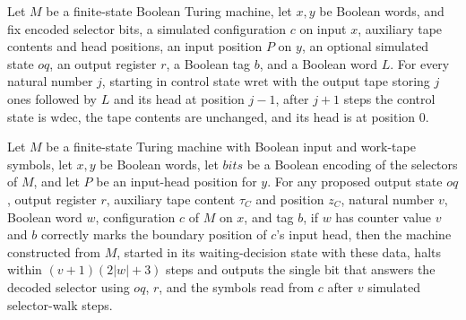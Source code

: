 \begin{theorem}
\label{Complexity.Meyer.wret_sweep}
\leanok
{}
Let $M$ be a finite-state Boolean Turing machine, let $x,y$ be Boolean words, and fix
encoded selector bits, a simulated configuration $c$ on input $x$, auxiliary tape
contents and head positions, an input position $P$ on $y$, an optional simulated state
$oq$, an output register $r$, a Boolean tag $b$, and a Boolean word $L$. For every
natural number $j$, starting in control state $\mathrm{wret}$ with the output tape
storing $j$ ones followed by $L$ and its head at position $j-1$, after $j+1$ steps the
control state is $\mathrm{wdec}$, the tape contents are unchanged, and its head is at
position $0$.
\end{theorem}

\begin{theorem}
\label{Complexity.Meyer.walk_run}
\leanok
{}
Let $M$ be a finite-state Turing machine with Boolean input and work-tape symbols, let
$x,y$ be Boolean words, let $bits$ be a Boolean encoding of the selectors of $M$, and
let $P$ be an input-head position for $y$. For any proposed output state $oq$, output
register $r$, auxiliary tape content $\tau_C$ and position $z_C$, natural number $v$,
Boolean word $w$, configuration $c$ of $M$ on $x$, and tag $b$, if $w$ has counter value
$v$ and $b$ correctly marks the boundary position of $c$'s input head, then the machine
constructed from $M$, started in its waiting-decision state with these data, halts
within $(v+1)(2|w|+3)$ steps and outputs the single bit that answers the decoded
selector using $oq$, $r$, and the symbols read from $c$ after $v$ simulated
selector-walk steps.
\end{theorem}
